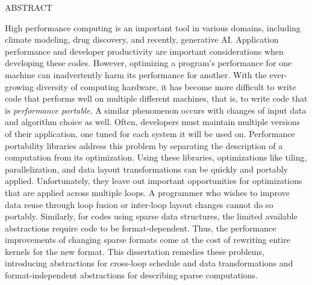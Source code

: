 \listoftables %




\pagebreak

\addchaptertocentry{\abstractname} %

\begin{center}
\MakeUppercase{Abstract}\\ \bigskip
\end{center}


High performance computing is an important tool in various domains, including climate modeling, drug discovery, and recently, generative AI\@.
Application performance and developer productivity are important considerations when developing these codes.
However, optimizing a program's performance for one machine can inadvertently harm its performance for another.
With the ever-growing diversity of computing hardware, it has become more difficult to write code that performs well on multiple different machines, that is, to write code that is \textit{performance portable}.
A similar phenomenon occurs with changes of input data and algorithm choice as well.
Often, developers must maintain multiple versions of their application, one tuned for each system it will be used on.
Performance portability libraries address this problem by separating the description of a computation from its optimization.
Using these libraries, optimizations like tiling, parallelization, and data layout transformations can be quickly and portably applied.
Unfortunately, they leave out important opportunities for optimizations that are applied across multiple loops.
A programmer who wishes to improve data reuse through loop fusion or inter-loop layout changes cannot do so portably.
Similarly, for codes using sparse data structures, the limited available abstractions require code to be format-dependent.
Thus, the performance improvements of changing sparse formats come at the cost of rewriting entire kernels for the new format.
This dissertation remedies these problems, introducing abstractions for cross-loop schedule and data transformations and format-independent abstractions for describing sparse computations.

